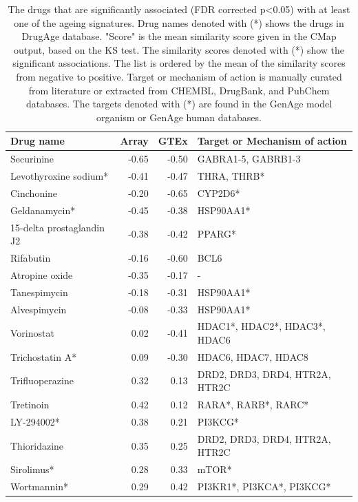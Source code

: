 \documentclass[12pt,twoside]{unicam}
\begin{document}
\begin{longtable}[t]{lrr>{\raggedright\arraybackslash}p{6cm}}
\caption[Drugs that are significantly associated with the ageing signatures.]{\label{tab:drugTable1}The drugs that are significantly associated (FDR corrected p<0.05) with at least one of the ageing signatures. Drug names denoted with (*) shows the drugs in DrugAge database. "Score" is the mean similarity score given in the CMap output, based on the KS test. The similarity scores denoted with (*) show the significant associations. The list is ordered by the mean of the similarity scores from negative to positive. Target or mechanism of action is manually curated from literature or extracted from CHEMBL, DrugBank, and PubChem databases. The targets denoted with (*) are found in the GenAge model organism or GenAge human databases.}\\
\toprule
Drug name & Array & GTEx & Target or Mechanism of action\\
\midrule
\rowcolor{gray!6}  Securinine & -0.65 & -0.50 & GABRA1-5, GABRB1-3\\
Levothyroxine sodium* & -0.41 & -0.47 & THRA, THRB*\\
\rowcolor{gray!6}  Cinchonine & -0.20 & -0.65 & CYP2D6*\\
Geldanamycin* & -0.45 & -0.38 & HSP90AA1*\\
\rowcolor{gray!6}  15-delta prostaglandin J2 & -0.38 & -0.42 & PPARG*\\
\addlinespace
Rifabutin & -0.16 & -0.60 & BCL6\\
\rowcolor{gray!6}  Atropine oxide & -0.35 & -0.17 & -\\
Tanespimycin & -0.18 & -0.31 & HSP90AA1*\\
\rowcolor{gray!6}  Alvespimycin & -0.08 & -0.33 & HSP90AA1*\\
Vorinostat & 0.02 & -0.41 & HDAC1*, HDAC2*, HDAC3*, HDAC6\\
\addlinespace
\rowcolor{gray!6}  Trichostatin A* & 0.09 & -0.30 & HDAC6, HDAC7, HDAC8\\
Trifluoperazine & 0.32 & 0.13 & DRD2, DRD3, DRD4, HTR2A, HTR2C\\
\rowcolor{gray!6}  Tretinoin & 0.42 & 0.12 & RARA*, RARB*, RARC*\\
LY-294002* & 0.38 & 0.21 & PI3KCG*\\
\rowcolor{gray!6}  Thioridazine & 0.35 & 0.25 & DRD2, DRD3, DRD4, HTR2A, HTR2C\\
\addlinespace
Sirolimus* & 0.28 & 0.33 & mTOR*\\
\rowcolor{gray!6}  Wortmannin* & 0.29 & 0.42 & PI3KR1*, PI3KCA*, PI3KCG*\\

\end{longtable}
\end{document}
